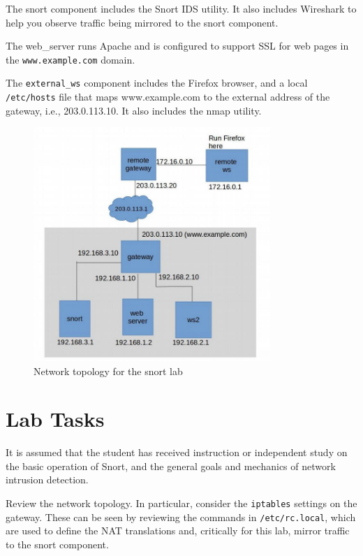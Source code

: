 The snort component includes the Snort IDS utility.  It also includes Wireshark
to help you observe traffic being mirrored to the snort component.

The web\_server runs Apache and is configured to support SSL for web pages in the
{\tt www.example.com} domain.

The {\tt external\_ws} component includes the Firefox browser, and a local 
{\tt /etc/hosts} file that maps www.example.com to the external address of the
gateway, i.e., 203.0.113.10.  It also includes the nmap utility.


\begin{figure}[htb]
\begin{center}
\includegraphics [width=0.8\textwidth,natwidth=621,natheight=403]{snort.jpg}
\end{center}
\caption{Network topology for the snort lab}
\label{fig:topology}
\end{figure}

\section{Lab Tasks}
It is assumed that the student has received instruction or independent study on
the basic operation of Snort, and the general goals and mechanics of network intrusion detection.

Review the network topology.  In particular, consider the {\tt iptables} settings on the gateway.
These can be seen by reviewing the commands in {\tt /etc/rc.local}, which are used to
define the NAT translations and, critically for this lab, mirror traffic to the snort component. 

